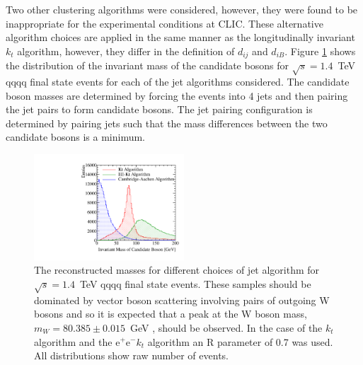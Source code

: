 \noindent Two other clustering algorithms were considered, however, they were found to be inappropriate for the experimental conditions at CLIC.  These alternative algorithm choices are applied in the same manner as the longitudinally invariant $k_{t}$ algorithm, however, they differ in the definition of $d_{ij}$ and $d_{iB}$.  Figure \ref{fig:invariantmassalgoveto} shows the distribution of the invariant mass of the candidate bosons for $\sqrt{s}=1.4$~TeV \nu{\nu}qqqq final state events for each of the jet algorithms considered.  The candidate boson masses are determined by forcing the events into 4 jets and then pairing the jet pairs to form candidate bosons.  The jet pairing configuration is determined by pairing jets such that the mass differences between the two candidate bosons is a minimum.  

\begin{figure}[h!]
\centering
\includegraphics[width=0.5\textwidth]{PhysicsAnalysis/Plots/SimpleInvMassPlot/InvariantMassesAlgorithmVeto.pdf}
\caption[The reconstructed masses for different choices of jet algorithm for $\sqrt{s}=1.4$~TeV \nu{\nu}qqqq final state events.  These samples should be dominated by vector boson scattering involving pairs of outgoing W bosons and so it is expected that a peak at the W boson mass, $m_{W} = 80.385 \pm 0.015$~GeV \cite{Beringer:1900zz}, should be observed.  In the case of the $k_{t}$ algorithm and the $\text{e}^{+}\text{e}^{-}k_{t}$  algorithm an R parameter of 0.7 was used.  All distributions show raw number of events.]{The reconstructed masses for different choices of jet algorithm for $\sqrt{s}=1.4$~TeV \nu{\nu}qqqq final state events.  These samples should be dominated by vector boson scattering involving pairs of outgoing W bosons and so it is expected that a peak at the W boson mass, $m_{W} = 80.385 \pm 0.015$~GeV \cite{Beringer:1900zz}, should be observed.  In the case of the $k_{t}$ algorithm and the $\text{e}^{+}\text{e}^{-}k_{t}$  algorithm an R parameter of 0.7 was used.  All distributions show raw number of events.}
\label{fig:invariantmassalgoveto}
\end{figure}

